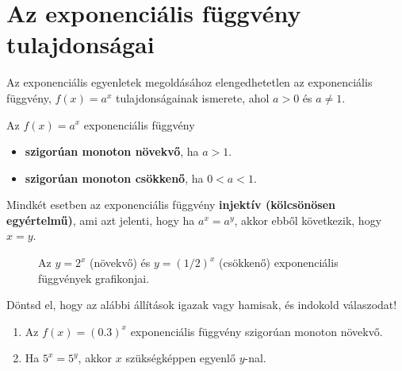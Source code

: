 \documentclass[a4paper,12pt]{article}
\theoremstyle{definition} %
\begin{document}
\section*{Az exponenciális függvény tulajdonságai}

Az exponenciális egyenletek megoldásához elengedhetetlen az exponenciális függvény, $f(x) = a^x$ tulajdonságainak ismerete, ahol $a > 0$ és $a \neq 1$.

\begin{teteldoboz}
Az $f(x) = a^x$ exponenciális függvény
\begin{itemize}
    \item \textbf{szigorúan monoton növekvő}, ha $a > 1$.
    \item \textbf{szigorúan monoton csökkenő}, ha $0 < a < 1$.
\end{itemize}
Mindkét esetben az exponenciális függvény \textbf{injektív (kölcsönösen egyértelmű)}, ami azt jelenti, hogy ha $a^x = a^y$, akkor ebből következik, hogy $x = y$.
\end{teteldoboz}

\begin{figure}[h!]
    \centering
    \caption{Az $y=2^x$ (növekvő) és $y=(1/2)^x$ (csökkenő) exponenciális függvények grafikonjai.}
    \label{fig:exp_fuggveny}
\end{figure}

\begin{feladatdoboz}
Döntsd el, hogy az alábbi állítások igazak vagy hamisak, és indokold válaszodat!
\begin{enumerate}[label=(\alph*)]
    \item Az $f(x) = (0.3)^x$ exponenciális függvény szigorúan monoton növekvő.
    \item Ha $5^x = 5^y$, akkor $x$ szükségképpen egyenlő $y$-nal.
\end{enumerate}
\end{feladatdoboz}
\end{document}

